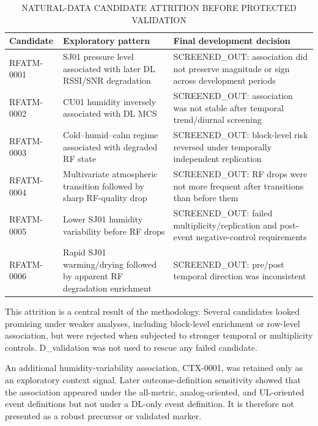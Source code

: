 \documentclass{ieeeaccess}
\begin{document}
\begin{table}[t]
\caption{NATURAL-DATA CANDIDATE ATTRITION BEFORE PROTECTED VALIDATION}
\label{tab:iii}
\centering
\scriptsize
\setlength{\tabcolsep}{3pt}
\renewcommand{\arraystretch}{1.15}
\begin{tabularx}{\textwidth}{>{\raggedright\arraybackslash}X >{\raggedright\arraybackslash}X >{\raggedright\arraybackslash}X}
\toprule
Candidate & Exploratory pattern & Final development decision \\
\midrule
RFATM-0001 & SJ01 pressure level associated with later DL RSSI/SNR degradation & SCREENED\_OUT: association did not preserve magnitude or sign across development periods \\
RFATM-0002 & CU01 humidity inversely associated with DL MCS & SCREENED\_OUT: association was not stable after temporal trend/diurnal screening \\
RFATM-0003 & Cold--humid--calm regime associated with degraded RF state & SCREENED\_OUT: block-level risk reversed under temporally independent replication \\
RFATM-0004 & Multivariate atmospheric transition followed by sharp RF-quality drop & SCREENED\_OUT: RF drops were not more frequent after transitions than before them \\
RFATM-0005 & Lower SJ01 humidity variability before RF drops & SCREENED\_OUT: failed multiplicity/replication and post-event negative-control requirements \\
RFATM-0006 & Rapid SJ01 warming/drying followed by apparent RF degradation enrichment & SCREENED\_OUT: pre/post temporal direction was inconsistent \\
\bottomrule
\end{tabularx}
\end{table}

This attrition is a central result of the methodology. Several candidates looked promising under weaker analyses, including block-level enrichment or row-level association, but were rejected when subjected to stronger temporal or multiplicity controls. D\_validation was not used to rescue any failed candidate.

An additional humidity-variability association, CTX-0001, was retained only as an exploratory context signal. Later outcome-definition sensitivity showed that the association appeared under the all-metric, analog-oriented, and UL-oriented event definitions but not under a DL-only event definition. It is therefore not presented as a robust precursor or validated marker.
\end{document}
